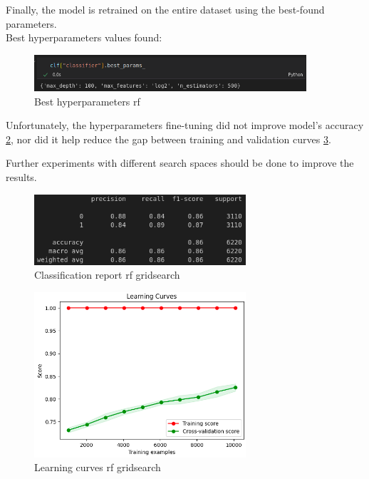 \documentclass[a4paper,12pt]{article}
\begin{document}
Finally, the model is retrained on the entire dataset using the best-found parameters.\\

Best hyperparameters values found:
\begin{figure}[H]
  \centering
  \includegraphics[width=0.9\textwidth]{./images/best_params.png}
  \caption{Best hyperparameters rf}
  \label{fig:best_params_rf}
\end{figure}

Unfortunately, the hyperparameters fine-tuning did not improve model's accuracy \ref{fig:report_rf_gridsearch}, nor did it help reduce the gap between training and validation curves \ref{fig:lc_rf_gridsearch}. 

Further experiments with different search spaces should be done to improve the results.

\begin{figure}[H]
  \centering
  \includegraphics[width=0.7\textwidth]{./images/report_rf_gridsearch.png}
  \caption{Classification report rf gridsearch}
  \label{fig:report_rf_gridsearch}
\end{figure}

\begin{figure}[H]
  \centering
  \includegraphics[width=0.7\textwidth]{./images/lc_rf_gridsearch.png}
  \caption{Learning curves rf gridsearch}
  \label{fig:lc_rf_gridsearch}
\end{figure}
\end{document}

